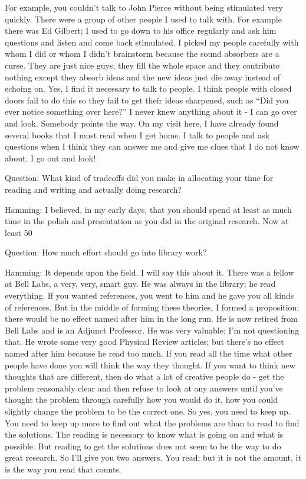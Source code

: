 \documentclass{article}
\begin{document}
For example, you couldn't talk to John Pierce without being stimulated very quickly. There were a group of other people I used to talk with. For example there was Ed Gilbert; I used to go down to his office regularly and ask him questions and listen and come back stimulated. I picked my people carefully with whom I did or whom I didn't brainstorm because the sound absorbers are a curse. They are just nice guys; they fill the whole space and they contribute nothing except they absorb ideas and the new ideas just die away instead of echoing on. Yes, I find it necessary to talk to people. I think people with closed doors fail to do this so they fail to get their ideas sharpened, such as ``Did you ever notice something over here?'' I never knew anything about it - I can go over and look. Somebody points the way. On my visit here, I have already found several books that I must read when I get home. I talk to people and ask questions when I think they can answer me and give me clues that I do not know about. I go out and look!

Question: What kind of tradeoffs did you make in allocating your time for reading and writing and actually doing research?

Hamming: I believed, in my early days, that you should spend at least as much time in the polish and presentation as you did in the original research. Now at least 50%

Question: How much effort should go into library work?

Hamming: It depends upon the field. I will say this about it. There was a fellow at Bell Labs, a very, very, smart guy. He was always in the library; he read everything. If you wanted references, you went to him and he gave you all kinds of references. But in the middle of forming these theories, I formed a proposition: there would be no effect named after him in the long run. He is now retired from Bell Labs and is an Adjunct Professor. He was very valuable; I'm not questioning that. He wrote some very good Physical Review articles; but there's no effect named after him because he read too much. If you read all the time what other people have done you will think the way they thought. If you want to think new thoughts that are different, then do what a lot of creative people do - get the problem reasonably clear and then refuse to look at any answers until you've thought the problem through carefully how you would do it, how you could slightly change the problem to be the correct one. So yes, you need to keep up. You need to keep up more to find out what the problems are than to read to find the solutions. The reading is necessary to know what is going on and what is possible. But reading to get the solutions does not seem to be the way to do great research. So I'll give you two answers. You read; but it is not the amount, it is the way you read that counts.
\end{document}
